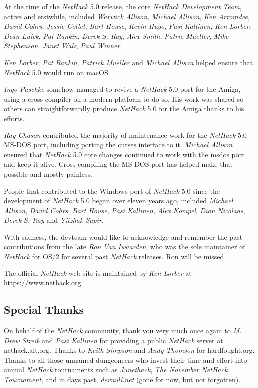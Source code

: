 \documentclass[titlepage]{article}
\begin{document}
\medskip
At the time of the \textit{NetHack} 5.0 release, the core
\textit{NetHack Development Team},
active and erstwhile, included \textit{Warwick Allison}, \textit{Michael Allison},
\textit{Ken Arromdee}, \textit{David Cohrs}, \textit{Jessie Collet}, \textit{Bart House},
\textit{Kevin Hugo}, \textit{Pasi Kallinen}, \textit{Ken Lorber}, \textit{Dean Luick},
\textit{Pat Rankin}, \textit{Derek S. Ray}, \textit{Alex Smith}, \textit{Patric Mueller},
\textit{Mike Stephenson}, \textit{Janet Walz}, \textit{Paul Winner}.

\medskip
\textit{Ken Lorber}, \textit{Pat Rankin}, \textit{Patrick Mueller} and
\textit{Michael Allison} helped ensure that \textit{NetHack} 5.0 would run
on macOS.

\medskip
\textit{Ingo Paschke} somehow managed to revive a \textit{NetHack} 5.0 port for the Amiga,
using a cross-compiler on a modern platform to do so. His work was shared so
others can straightforwardly produce \textit{NetHack} 5.0 for the Amiga thanks to his
efforts.

\medskip
\textit{Ray Chason} contributed the majority of maintenance work for the
\textit{NetHack} 5.0 MS-DOS port, including porting the curses interface to it.
\textit{Michael Allison} ensured that \textit{NetHack} 5.0 core changes continued to
work with the msdos port and keep it alive.  Cross-compiling the MS-DOS
port has helped make that possible and mostly painless.

\medskip
People that contributed to the Windows port of \textit{NetHack} 5.0 since the
development of \textit{NetHack} 5.0 began over eleven years ago, included
\textit{Michael Allison}, \textit{David Cohrs}, \textit{Bart House},
\textit{Pasi Kallinen}, \textit{Alex Kompel}, \textit{Dion Nicolaas},
\textit{Derek S. Ray} and \textit{Yitzhak Sapir}.

\medskip
With sadness, the devteam would like to acknowledge and remember the past
contributions from the late \textit{Ron Van Iwaarden}, who was the sole maintainer
of \textit{NetHack} for OS/2 for several past \textit{NetHack} releases. Ron will be missed.

\medskip
\noindent The official \textit{NetHack} web site is maintained by \textit{Ken Lorber} at
\url{https://www.nethack.org}.


\subsection*{Special Thanks}
\noindent On behalf of the \textit{NetHack} community, thank you very much once
again to \textit{M. Drew Streib} and \textit{Pasi Kallinen} for providing a
public \textit{NetHack} server at nethack.alt.org. Thanks to \textit{Keith Simpson}
and \textit{Andy Thomson} for hardfought.org. Thanks to all those
unnamed dungeoneers who invest their time and effort into annual
\textit{NetHack} tournaments such as \textit{Junethack},
\textit{The November NetHack Tournament}, and in days past,
\textit{devnull.net} (gone for now, but not forgotten).
\clearpage
\end{document}
